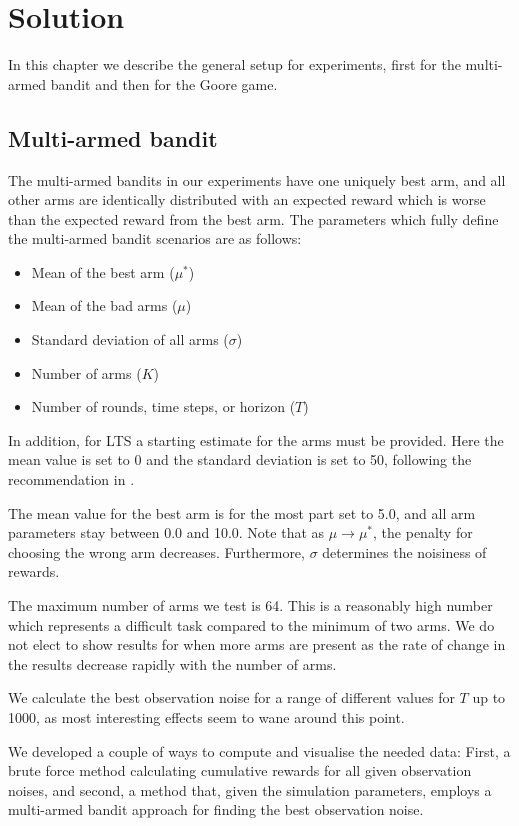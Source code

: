 \chapter{Solution}
\label{ch:solution}

In this chapter we describe the general setup for experiments, first for the multi-armed bandit and then for the Goore game.

\section{Multi-armed bandit}
The multi-armed bandits in our experiments have one uniquely best arm, and all other arms are identically distributed with an expected reward which is worse than the expected reward from the best arm.
The parameters which fully define the multi-armed bandit scenarios are as follows:
\begin{itemize}
    \item Mean of the best arm ($\mu^*$)
    \item Mean of the bad arms ($\mu$)
    \item Standard deviation of all arms ($\sigma$)
    \item Number of arms ($K$)
    \item Number of rounds, time steps, or horizon ($T$)
\end{itemize}

In addition, for LTS a starting estimate for the arms must be provided.
Here the mean value is set to 0 and the standard deviation is set to 50, following the recommendation in \cite{Glimsdal12}.

The mean value for the best arm is for the most part set to 5.0, and all arm parameters stay between 0.0 and 10.0.
Note that as $\mu \to \mu^*$, the penalty for choosing the wrong arm decreases.
Furthermore, $\sigma$ determines the noisiness of rewards.

The maximum number of arms we test is 64.
This is a reasonably high number which represents a difficult task compared to the minimum of two arms.
We do not elect to show results for when more arms are present as the rate of change in the results decrease rapidly with the number of arms.

We calculate the best observation noise for a range of different values for $T$ up to 1000, as most interesting effects seem to wane around this point.

We developed a couple of ways to compute and visualise the needed data:
First, a brute force method calculating cumulative rewards for all given observation noises, and second, a method that, given the simulation parameters, employs a multi-armed bandit approach for finding the best observation noise.

